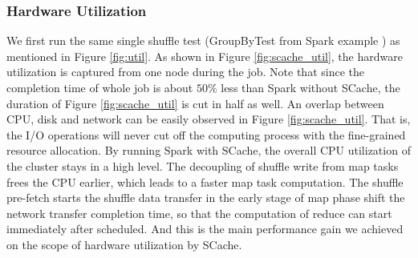 \subsubsection{Hardware Utilization}
We first run the same single shuffle test (GroupByTest from Spark example \cite{sparksource}) as mentioned in Figure \ref{fig:util}. As shown in Figure \ref{fig:scache_util}, the hardware utilization is captured from one node during the job. Note that since the completion time of whole job is about $50\%$ less than Spark without SCache, the duration of Figure \ref{fig:scache_util} is cut in half as well. An overlap between CPU, disk and network can be easily observed in Figure \ref{fig:scache_util}. That is, the I/O operations will never cut off the computing process with the fine-grained resource allocation. By running Spark with SCache, the overall CPU utilization of the cluster stays in a high level. The decoupling of shuffle write from map tasks frees the CPU earlier, which leads to a faster map task computation. The shuffle pre-fetch starts the shuffle data transfer in the early stage of map phase shift the network transfer completion time, so that the computation of reduce can start immediately after scheduled. And this is the main performance gain we achieved on the scope of hardware utilization by SCache.
